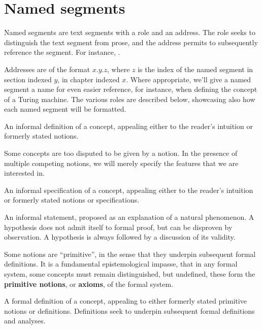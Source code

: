 \section{Named segments}

Named segments are text segments with a role and an address. The role seeks to
distinguish the text segment from prose, and the address permits to
subsequently reference the segment. For instance, .

Addresses are of the format \mbox{$x$.$y$.$z$}, where $z$ is the index of the
named segment in section indexed $y$, in chapter indexed $x$. Where
appropriate, we'll give a named segment a name for even easier reference, for
instance, when defining the concept of a Turing machine. The various roles are
described below, showcasing also how each named segment will be formatted.

\begin{notion} An informal definition of a concept, appealing either to the
reader's intuition or formerly stated notions. \end{notion}

Some concepts are too disputed to be given by a notion. In the presence of
multiple competing notions, we will merely specify the features that we are
interested in.

\begin{specification} An informal specification of a concept, appealing either
to the reader's intuition or formerly stated notions or specifications.
\end{specification}

\begin{hypothesis} An informal statement, proposed as an explanation of a
natural phenomenon. A hypothesis does not admit itself to formal proof, but can
be disproven by observation. A hypothesis is always followed by a discussion of
its validity. \end{hypothesis}

Some notions are ``primitive'', in the sense that they underpin subsequent
formal definitions. It is a fundamental epistemological impasse, that in any
formal system, some concepts must remain distinguished, but undefined, these
form the \textbf{primitive notions}, or \textbf{axioms}, of the formal system.

\begin{definition} A formal definition of a concept, appealing to either
formerly stated primitive notions or definitions. Definitions seek to underpin
subsequent formal definitions and analyses. \end{definition}

